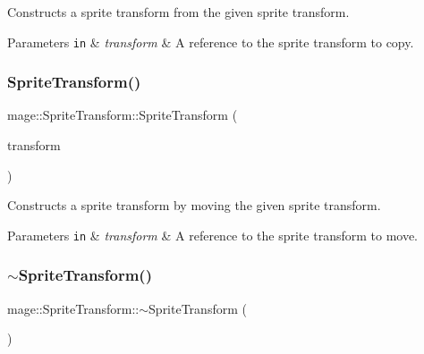 Constructs a sprite transform from the given sprite transform.


\begin{DoxyParams}[1]{Parameters}
\mbox{\tt in}  & {\em transform} & A reference to the sprite transform to copy. \\
\hline
\end{DoxyParams}
\hypertarget{classmage_1_1_sprite_transform_a53d7da4498f4f9f67be2994eb4593c3a}{}\label{classmage_1_1_sprite_transform_a53d7da4498f4f9f67be2994eb4593c3a} 
\subsubsection{\texorpdfstring{Sprite\+Transform()}{SpriteTransform()}\hspace{0.1cm}{\footnotesize\ttfamily [4/4]}}
{\footnotesize\ttfamily mage\+::\+Sprite\+Transform\+::\+Sprite\+Transform (\begin{DoxyParamCaption}\item[{\hyperlink{classmage_1_1_sprite_transform}{Sprite\+Transform} \&\&}]{transform }\end{DoxyParamCaption})\hspace{0.3cm}{\ttfamily [default]}}

Constructs a sprite transform by moving the given sprite transform.


\begin{DoxyParams}[1]{Parameters}
\mbox{\tt in}  & {\em transform} & A reference to the sprite transform to move. \\
\hline
\end{DoxyParams}
\hypertarget{classmage_1_1_sprite_transform_a14a3614023996cbb071c3de99f9528bc}{}\label{classmage_1_1_sprite_transform_a14a3614023996cbb071c3de99f9528bc} 
\subsubsection{\texorpdfstring{$\sim$\+Sprite\+Transform()}{~SpriteTransform()}}
{\footnotesize\ttfamily mage\+::\+Sprite\+Transform\+::$\sim$\+Sprite\+Transform (\begin{DoxyParamCaption}{ }\end{DoxyParamCaption})\hspace{0.3cm}{\ttfamily [default]}}


